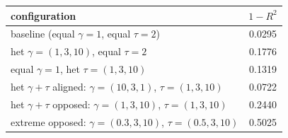 \documentclass[border=2pt]{standalone}
\begin{document}
\begin{tabular}{lc}
\toprule
configuration  &  $1-R^2$ \\
\midrule
  baseline (equal $\gamma=1$, equal $\tau=2$)  &  0.0295 \\
  het $\gamma=(1,3,10)$, equal $\tau=2$  &  0.1776 \\
  equal $\gamma=1$, het $\tau=(1,3,10)$  &  0.1319 \\
  het $\gamma+\tau$ aligned: $\gamma=(10,3,1)$, $\tau=(1,3,10)$  &  0.0722 \\
  het $\gamma+\tau$ opposed: $\gamma=(1,3,10)$, $\tau=(1,3,10)$  &  0.2440 \\
  extreme opposed: $\gamma=(0.3,3,10)$, $\tau=(0.5,3,10)$  &  0.5025 \\
\bottomrule
\end{tabular}
\end{document}
